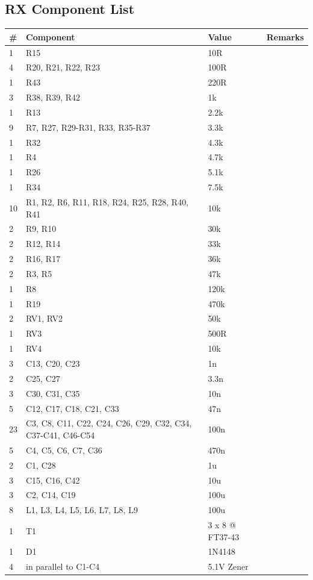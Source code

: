 \documentclass[10pt, a4paper,twoside]{scrartcl}
\begin{document}
\subsection{RX Component List}  \label{sec:rxcomp}
\begin{longtable}{|l|p{6cm}|l|l|} \hline 
\# & Component & Value & Remarks \\ \hline 
1 & R15 & 10R & \\
4 & R20, R21, R22, R23 & 100R & \\
1 & R43 & 220R & \\
3 & R38, R39, R42 & 1k & \\
1 & R13 & 2.2k & \\
9 & R7, R27, R29-R31, R33, R35-R37 & 3.3k & \\
1 & R32 & 4.3k & \\
1 & R4 & 4.7k & \\
1 & R26 & 5.1k & \\
1 & R34 & 7.5k & \\
10 & R1, R2, R6, R11, R18, R24, R25, R28, R40, R41 & 10k & \\
2 & R9, R10 & 30k & \\
2 & R12, R14 & 33k & \\
2 & R16, R17 & 36k & \\
2 & R3, R5 & 47k & \\
1 & R8 & 120k & \\
1 & R19 & 470k & \\
2 & RV1, RV2 & 50k & \\
1 & RV3 & 500R & \\
1 & RV4 & 10k & \\
3 & C13, C20, C23 & 1n & \\
2 & C25, C27 & 3.3n & \\
3 & C30, C31, C35 & 10n & \\
5 & C12, C17, C18, C21, C33 & 47n & \\
23 & C3, C8, C11, C22, C24, C26, C29, C32, C34, C37-C41, C46-C54 & 100n & \\
5 & C4, C5, C6, C7, C36 & 470n & \\
2 & C1, C28 & 1u & \\
3 & C15, C16, C42 & 10u & \\
3 & C2, C14, C19 & 100u & \\
8 & L1, L3, L4, L5, L6, L7, L8, L9 & 100u & \\
1 & T1 & 3 x 8 @ FT37-43 & \\
1 & D1 & 1N4148 & \\
4 & in parallel to C1-C4 & 5.1V Zener & \\

\end{longtable}
\end{document}
